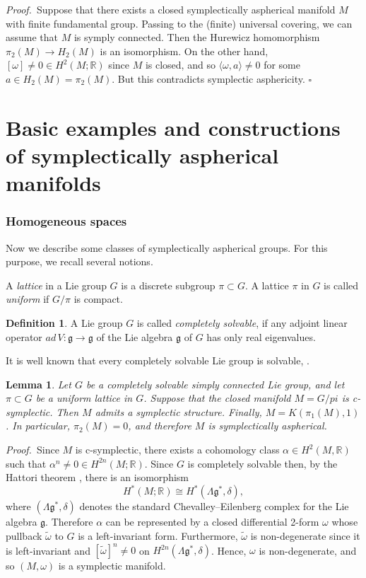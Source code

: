 \documentclass[12pt, twoside]{amsart}
\theoremstyle{plain}
\newtheorem{lemma}[theorem]{Lemma}
\theoremstyle{definition}
\newtheorem{df}[theorem]{Definition}
\numberwithin{equation}{section}
\def\RR{\mathbb R}
\def\hqed{\hfill\hfill$\square$}
\def\la{\langle}
\def\ra{\rangle}
\def\RR{\mathbb R}
\def\p{{\it Proof.\ }}
\begin{document}
\p Suppose that there exists a closed symplectically aspherical manifold $M$ 
with finite fundamental group. Passing to the (finite) universal covering, 
we can assume that $M$ is symply connected. Then the  Hurewicz 
homomorphism $\pi_2(M) \to H_2(M)$ is an isomorphism. On the other hand, 
$[\omega]\ne 0 \in H^2(M;\RR)$ since $M$ is closed, and so $\la \omega, 
a\ra\ne 
0$ for some $a\in H_2(M)=\pi_2(M)$. But this contradicts symplectic 
asphericity. 
\hqed




\part{Basic examples and constructions of symplectically aspherical manifolds}

\section{Homogeneous spaces}\label{sec-homogen}

Now we describe some classes of symplectically aspherical groups. For
this purpose, we recall several notions. 

A {\it lattice} in a Lie group $G$ is a discrete subgroup $\pi\subset G$. A
lattice $\pi$ in $G$ is called {\it uniform} if $G/\pi$ is compact. 

\begin{df} \rm A Lie group $G$ is called {\it completely solvable},
if any adjoint linear operator $ad\,V: \mathfrak g\to\mathfrak g$ of the Lie 
algebra $\mathfrak g$ of $G$ has only real eigenvalues.
\end{df}

It is well known that every completely solvable Lie group is solvable,
\cite{VGS} .

\begin{lemma}\label{compl-solv} 
Let $G$ be a completely solvable simply connected Lie group, and let $\pi 
\subset G$ be a uniform lattice in $G$. Suppose that the closed manifold 
$M=G/pi$ is c-symplectic. Then $M$ admits a symplectic structure. Finally, 
$M=K(\pi_1(M),1)$. In particular, $\pi_2(M)=0$, and therefore $M$ is 
symplectically aspherical. 
\end{lemma}

\p Since $M$ is c-symplectic, there exists a cohomology class $\alpha\in 
H^{2}(M,\RR)$ 
such that $\alpha^n\not=0\in H^{2n}(M;\RR)$. Since  $G$ is completely
solvable then, by the Hattori theorem \cite{Ha}, there is an isomorphism 
$$ 
H^*(M;\RR)\cong H^*(\Lambda\mathfrak g^*,\delta),
$$ 
 where $(\Lambda\mathfrak g^*, \delta)$ denotes the standard
Chevalley--Eilenberg complex for the Lie algebra $\mathfrak g$.  Therefore 
$\alpha$
can be represented by a closed differential 2-form $\omega$ whose pullback
$\widetilde \omega$ to $G$ is a left-invariant form.
Furthermore, $\widetilde\omega$ is non-degenerate since it is left-invariant 
and 
$[\widetilde\omega]^n\not=0$ on $H^{2n}(\Lambda\mathfrak g^*,\delta)$.
Hence, $\omega$ is non-degenerate, and so $(M, \omega)$ is a symplectic
manifold.  
\end{document}
